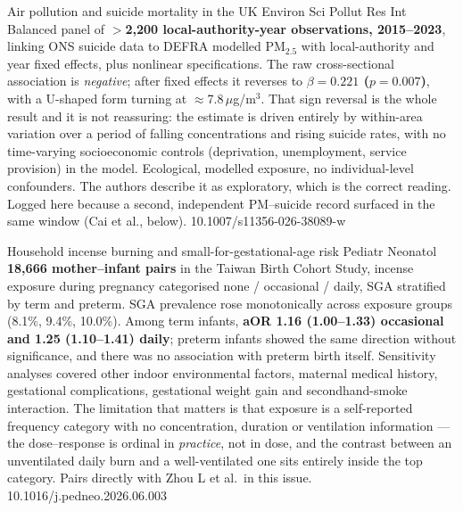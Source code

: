 \documentclass[10pt]{article}
\begin{document}
{Air pollution and suicide mortality in the UK}
{Environ Sci Pollut Res Int}
{Balanced panel of \textbf{$>$2{,}200 local-authority-year observations, 2015--2023},
linking ONS suicide data to DEFRA modelled PM$_{2.5}$ with local-authority and year fixed
effects, plus nonlinear specifications. The raw cross-sectional association is
\emph{negative}; after fixed effects it reverses to \textbf{$\beta = 0.221$
($p = 0.007$)}, with a U-shaped form turning at $\approx$7.8\,$\mu$g/m$^3$. That sign
reversal is the whole result and it is not reassuring: the estimate is driven entirely by
within-area variation over a period of falling concentrations and rising suicide rates,
with no time-varying socioeconomic controls (deprivation, unemployment, service
provision) in the model. Ecological, modelled exposure, no individual-level confounders.
The authors describe it as exploratory, which is the correct reading. Logged here because
a second, independent PM--suicide record surfaced in the same window (Cai et al., below).}
{10.1007/s11356-026-38089-w}


{Household incense burning and small-for-gestational-age risk}
{Pediatr Neonatol}
{\textbf{18{,}666 mother--infant pairs} in the Taiwan Birth Cohort Study, incense exposure
during pregnancy categorised none / occasional / daily, SGA stratified by term and
preterm. SGA prevalence rose monotonically across exposure groups (8.1\%, 9.4\%, 10.0\%).
Among term infants, \textbf{aOR 1.16 (1.00--1.33) occasional and 1.25 (1.10--1.41)
daily}; preterm infants showed the same direction without significance, and there was no
association with preterm birth itself. Sensitivity analyses covered other indoor
environmental factors, maternal medical history, gestational complications, gestational
weight gain and secondhand-smoke interaction. The limitation that matters is that
exposure is a self-reported frequency category with no concentration, duration or
ventilation information --- the dose--response is ordinal in \emph{practice}, not in dose,
and the contrast between an unventilated daily burn and a well-ventilated one sits
entirely inside the top category. Pairs directly with Zhou L et al.\ in this issue.}
{10.1016/j.pedneo.2026.06.003}
\end{document}
